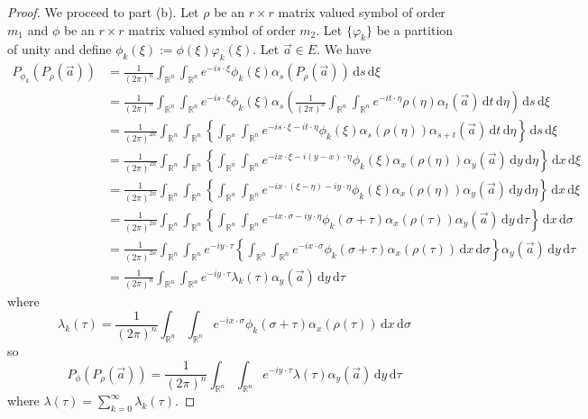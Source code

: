 \documentclass[10pt]{article}
\theoremstyle{remark}
\theoremstyle{definition}
\begin{document}
\begin{proof}
We proceed to part (b). Let $\rho$ be an $r\times r$ matrix valued symbol
of order $m_1$ and $\phi$ be an $r\times r$ matrix valued symbol of order
$m_2$. Let $\{\varphi_k\}$ be a partition of unity and define
$\phi_k(\xi):=\phi(\xi)\varphi_k(\xi)$. Let
$\vec{a}\in E$. We have
\begin{align*}
P_{\phi_k}(P_{\rho}(\vec{a})) &=
\frac{1}{(2\pi)^n}\int_{\mathbb R^n}\!\int_{\mathbb R^n}\!
e^{-is\cdot\xi}\phi_k(\xi)\alpha_s(P_{\rho}(\vec{a}))
\,\mathrm ds\,\mathrm d\xi \\
&= \frac{1}{(2\pi)^n}\int_{\mathbb R^n}\!\int_{\mathbb R^n}\!
e^{-is\cdot\xi}\phi_k(\xi)\alpha_s\left(
\frac{1}{(2\pi)^n}\int_{\mathbb R^n}\!\int_{\mathbb R^n}\!e^{-it\cdot\eta}
\rho(\eta)\alpha_t(\vec{a})\,\mathrm dt\,\mathrm d\eta\right)
\,\mathrm ds\,\mathrm d\xi \\
&= \frac{1}{(2\pi)^{2n}}\int_{\mathbb R^n}\!\int_{\mathbb R^n}\!
\left\{\int_{\mathbb R^n}\!\int_{\mathbb R^n}\!
e^{-is\cdot\xi-it\cdot\eta}\phi_k(\xi)\alpha_s(\rho(\eta))\alpha_{s+t}(\vec{a})
\,\mathrm dt\,\mathrm d\eta\right\}\,\mathrm ds\,\mathrm d\xi \\
&= \frac{1}{(2\pi)^{2n}}\int_{\mathbb R^n}\!\int_{\mathbb R^n}\!
\left\{\int_{\mathbb R^n}\!\int_{\mathbb R^n}\!
e^{-ix\cdot\xi-i(y-x)\cdot\eta}\phi_k(\xi)\alpha_x(\rho(\eta))\alpha_y(\vec{a})
\,\mathrm dy\,\mathrm d\eta\right\}\,\mathrm dx\,\mathrm d\xi \\
&= \frac{1}{(2\pi)^{2n}}\int_{\mathbb R^n}\!\int_{\mathbb R^n}\!
\left\{\int_{\mathbb R^n}\!\int_{\mathbb R^n}\!
e^{-ix\cdot(\xi-\eta)-iy\cdot\eta}
\phi_k(\xi)\alpha_x(\rho(\eta))\alpha_y(\vec{a})
\,\mathrm dy\,\mathrm d\eta\right\}\,\mathrm dx\,\mathrm d\xi \\
&= \frac{1}{(2\pi)^{2n}}\int_{\mathbb R^n}\!\int_{\mathbb R^n}\!
\left\{\int_{\mathbb R^n}\!\int_{\mathbb R^n}\!
e^{-ix\cdot\sigma-iy\cdot\eta}
\phi_k(\sigma+\tau)\alpha_x(\rho(\tau))\alpha_y(\vec{a})
\,\mathrm dy\,\mathrm d\tau\right\}\,\mathrm dx\,\mathrm d\sigma \\
&= \frac{1}{(2\pi)^{2n}}\int_{\mathbb R^n}\!\int_{\mathbb R^n}\!e^{-iy\cdot\tau}
\left\{\int_{\mathbb R^n}\!\int_{\mathbb R^n}\!e^{-ix\cdot\sigma}
\phi_k(\sigma+\tau)\alpha_x(\rho(\tau))\,\mathrm dx\,\mathrm d\sigma
\right\}\alpha_y(\vec{a})\,\mathrm dy\,\mathrm d\tau \\
&= \frac{1}{(2\pi)^n}\int_{\mathbb R^n}\!\int_{\mathbb R^n}\!e^{-iy\cdot\tau}
\lambda_k(\tau)\alpha_y(\vec{a})\,\mathrm dy\,\mathrm d\tau
\end{align*}
where
$$\lambda_k(\tau)=\frac{1}{(2\pi)^n}\int_{\mathbb R^n}\!\int_{\mathbb R^n}\!
e^{-ix\cdot\sigma}\phi_k(\sigma+\tau)\alpha_x(\rho(\tau))
\,\mathrm dx\,\mathrm d\sigma$$
so
$$P_{\phi}(P_{\rho}(\vec{a}))
=\frac{1}{(2\pi)^n}\int_{\mathbb R^n}\!\int_{\mathbb R^n}\!e^{-iy\cdot\tau}
\lambda(\tau)\alpha_y(\vec{a})\,\mathrm dy\,\mathrm d\tau$$
where $\lambda(\tau)=\sum_{k=0}^{\infty}\lambda_k(\tau)$.


\end{proof}
\end{document}
